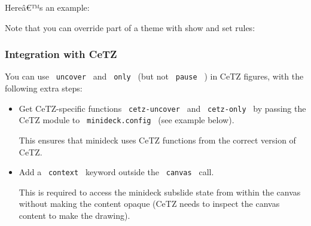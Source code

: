 Hereâ€™s an example:

\begin{Shaded}
\begin{Highlighting}[]

\NormalTok{)}

\NormalTok{\#slide[}
  
\NormalTok{]}
\end{Highlighting}
\end{Shaded}

Note that you can override part of a theme with show and set rules:

\begin{Shaded}
\begin{Highlighting}[]

\NormalTok{)}


\NormalTok{\#slide[}
  
\NormalTok{]}
\end{Highlighting}
\end{Shaded}

\subsubsection{Integration with CeTZ}\label{integration-with-cetz}

You can use \texttt{\ uncover\ } and \texttt{\ only\ } (but not
\texttt{\ pause\ } ) in CeTZ figures, with the following extra steps:

\begin{itemize}
\item
  Get CeTZ-specific functions \texttt{\ cetz-uncover\ } and
  \texttt{\ cetz-only\ } by passing the CeTZ module to
  \texttt{\ minideck.config\ } (see example below).

  This ensures that minideck uses CeTZ functions from the correct
  version of CeTZ.
\item
  Add a \texttt{\ context\ } keyword outside the \texttt{\ canvas\ }
  call.

  This is required to access the minideck subslide state from within the
  canvas without making the content opaque (CeTZ needs to inspect the
  canvas content to make the drawing).
\end{itemize}

